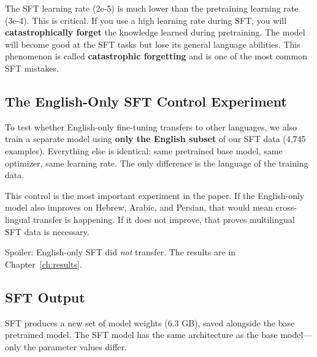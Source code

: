\documentclass[11pt,a4paper]{article}
\begin{document}
\begin{warning}
The SFT learning rate (2e-5) is much lower than the pretraining learning rate (3e-4). This is critical. If you use a high learning rate during SFT, you will \textbf{catastrophically forget} the knowledge learned during pretraining. The model will become good at the SFT tasks but lose its general language abilities. This phenomenon is called \textbf{catastrophic forgetting} and is one of the most common SFT mistakes.
\end{warning}

\subsection{The English-Only SFT Control Experiment}

To test whether English-only fine-tuning transfers to other languages, we also train a separate model using \textbf{only the English subset} of our SFT data (4,745 examples). Everything else is identical: same pretrained base model, same optimizer, same learning rate. The only difference is the language of the training data.

This control is the most important experiment in the paper. If the English-only model also improves on Hebrew, Arabic, and Persian, that would mean cross-lingual transfer is happening. If it does not improve, that proves multilingual SFT data is necessary.

Spoiler: English-only SFT did \emph{not} transfer. The results are in Chapter~\ref{ch:results}.

\subsection{SFT Output}

SFT produces a new set of model weights (6.3 GB), saved alongside the base pretrained model. The SFT model has the same architecture as the base model---only the parameter values differ.
\end{document}
